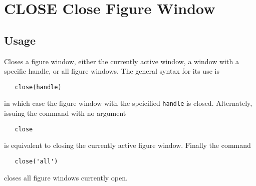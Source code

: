 \section{CLOSE Close Figure Window}

\subsection{Usage}

Closes a figure window, either the currently active window, a 
window with a specific handle, or all figure windows.  The general
syntax for its use is
\begin{verbatim}
   close(handle)
\end{verbatim}
in which case the figure window with the speicified \verb|handle| is
closed.  Alternately, issuing the command with no argument
\begin{verbatim}
   close
\end{verbatim}
is equivalent to closing the currently active figure window.  Finally
the command
\begin{verbatim}
   close('all')
\end{verbatim}
closes all figure windows currently open.

